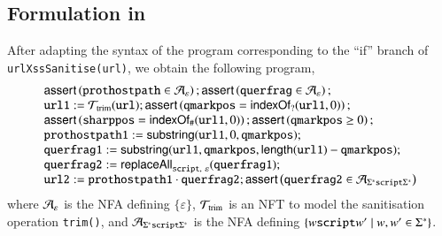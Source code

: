 {%
\subsection{Formulation in  {\slint}}
	After adapting the syntax of the program corresponding to the ``if'' branch of {\tt urlXssSanitise(url)},  %
	we obtain the following {\slint} program,
	\[ 
	\begin{array}{l}
	\ASSERT{\mathtt{prothostpath} \in \NFA_\varepsilon}; \ASSERT{\mathtt{querfrag} \in \NFA_\varepsilon};\\
	\mathtt{url1} := \NFT_{\rm trim}(\mathtt{url}); \ASSERT{\mathtt{qmarkpos} = \indexof_?(\mathtt{url1},0)};\\
	\ASSERT{\mathtt{sharppos} = \indexof_{\#}(\mathtt{url1}, 0)}; \ASSERT{\mathtt{qmarkpos} \ge 0};\\ 
	\mathtt{prothostpath1} := \substring(\mathtt{url1}, 0, \mathtt{qmarkpos});\\
	\mathtt{querfrag1} := \substring(\mathtt{url1, qmarkpos}, \length(\mathtt{url1}) - \mathtt{qmarkpos});\\
	\mathtt{querfrag2} := \replaceall_{\mathtt{script},\ \varepsilon}(\mathtt{querfrag1});\\
	\mathtt{url2} := \mathtt{prothostpath1} \concat \mathtt{querfrag2};\ASSERT{\mathtt{querfrag2} \in \NFA_{\Sigma^*\mathtt{script}\Sigma^*}}
	\end{array}
	\]
	where $\mathcal{A}_\varepsilon$ is the NFA defining $\{\varepsilon\}$, $\mathcal{T}_{\rm trim}$ is an NFT to model the sanitisation operation {\tt trim()}, and $ \mathcal{A}_{\Sigma^*\mathtt{script}\Sigma^*}$ is the NFA defining $\{w\mbox{\tt script} w' \mid w, w' \in \Sigma^*\}$. 



}
